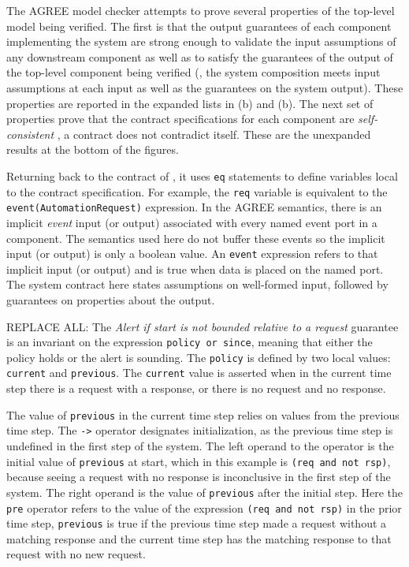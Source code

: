 The AGREE model checker attempts to prove several properties of the top-level model being verified.
The first is that the output guarantees of each component implementing the system are strong enough to validate the input assumptions of any downstream component as well as to satisfy the guarantees of the output of the top-level component being verified (\ie, the system composition meets input assumptions at each input as well as the guarantees on the system output).
These properties are reported in the expanded lists in (b) and (b).
The next set of properties prove that the contract specifications for each component are \emph{self-consistent} \ie, a contract does not contradict itself.
These are the unexpanded results at the bottom of the figures.

Returning back to the contract of , it uses \texttt{eq} statements to define variables local to the contract specification.
For example, the \texttt{req} variable is equivalent to the \texttt{event(AutomationRequest)} expression.
In the AGREE semantics, there is an implicit \emph{event} input (or output) associated with every named event port in a component.
The semantics used here do not buffer these events so the implicit input (or output) is only a boolean value.
An \texttt{event} expression refers to that implicit input (or output) and is true when data is placed on the named port.
The system contract here states assumptions on well-formed input, followed by guarantees on properties about the output.

REPLACE ALL:
The \emph{Alert if start is not bounded relative to a request} guarantee is an invariant on the expression \texttt{policy or since}, meaning that either the policy holds or the alert is sounding.
The \texttt{policy} is defined by two local values: \texttt{current} and \texttt{previous}.
The \texttt{current} value is asserted when in the current time step there is a request with a response, or there is no request and no response.

The value of \texttt{previous} in the current time step relies on values from the previous time step.
The \texttt{->} operator designates initialization, as the previous time step is undefined in the first step of the system.
The left operand to the operator is the initial value of \texttt{previous} at start, which in this example is \texttt{(req and not rsp)}, because seeing a request with no response is inconclusive in the first step of the system.
The right operand is the value of \texttt{previous} after the initial step.
Here the \texttt{pre} operator refers to the value of the expression \texttt{(req and not rsp)} in the prior time step, \texttt{previous} is true if the previous time step made a request without a matching response and the current time step has the matching response to that request with no new request.

